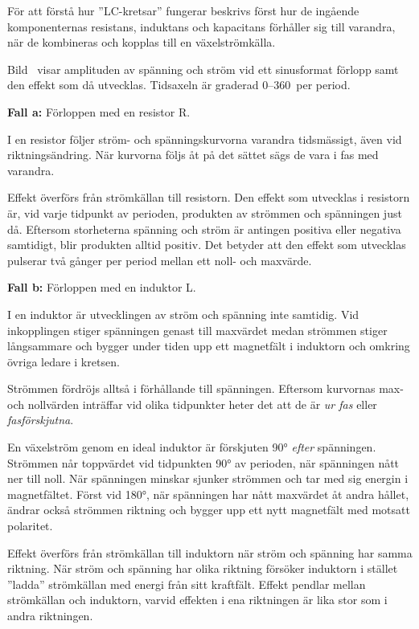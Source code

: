För att förstå hur ''LC-kretsar'' fungerar beskrivs först hur de ingående
komponenternas resistans, induktans och kapacitans förhåller sig till varandra,
när de kombineras och kopplas till en växelströmkälla.


Bild~ visar amplituden av spänning och ström vid ett
sinusformat förlopp samt den effekt som då utvecklas.
Tidsaxeln är graderad 0--360\degree~per period.

\textbf{Fall a:} Förloppen med en resistor R.

I en resistor följer ström- och spänningskurvorna varandra tidsmässigt, även
vid riktningsändring.
När kurvorna följs åt på det sättet sägs de vara i fas med varandra.

Effekt överförs från strömkällan till resistorn.
Den effekt som utvecklas i resistorn är, vid varje tidpunkt av perioden,
produkten av strömmen och spänningen just då.
Eftersom storheterna spänning och ström är antingen positiva eller negativa
samtidigt, blir produkten alltid positiv.
Det betyder att den effekt som utvecklas pulserar två gånger per period mellan
ett noll- och maxvärde.

\textbf{Fall b:} Förloppen med en induktor L.

I en induktor är utvecklingen av ström och spänning inte samtidig.
Vid inkopplingen stiger spänningen genast till maxvärdet medan strömmen stiger
långsammare och bygger under tiden upp ett magnetfält i induktorn och omkring
övriga ledare i kretsen.

Strömmen fördröjs alltså i förhållande till spänningen.
Eftersom kurvornas max- och nollvärden inträffar vid olika tidpunkter heter
det att de är \emph{ur fas} eller \emph{fasförskjutna}.

En växelström genom en ideal induktor är förskjuten \ang{90} \emph{efter}
spänningen.
Strömmen når toppvärdet vid tidpunkten \ang{90} av perioden, när spänningen nått
ner till noll.
När spänningen minskar sjunker strömmen och tar med sig energin i magnetfältet.
Först vid \ang{180}, när spänningen har nått maxvärdet åt andra hållet, ändrar
också strömmen riktning och bygger upp ett nytt magnetfält med motsatt
polaritet.

Effekt överförs från strömkällan till induktorn när ström och spänning har
samma riktning.
När ström och spänning har olika riktning försöker induktorn i stället
''ladda'' strömkällan med energi från sitt kraftfält.
Effekt pendlar mellan strömkällan och induktorn, varvid effekten i
ena riktningen är lika stor som i andra riktningen.

